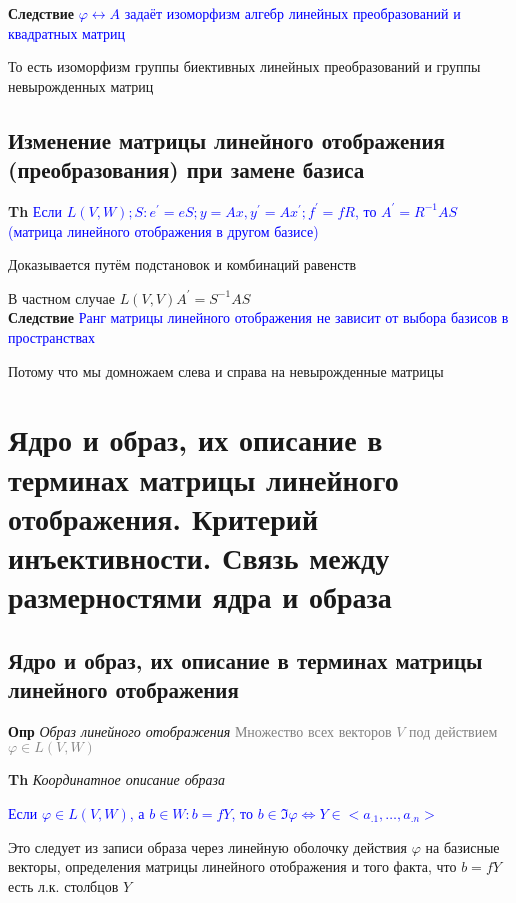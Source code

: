 \documentclass[a4paper, 14pt]{article}
\begin{document}
    \textbf{Следствие} \textcolor{blue}{$\varphi \leftrightarrow A$ задаёт изоморфизм алгебр линейных преобразований
    и квадратных матриц}

    То есть изоморфизм группы биективных линейных преобразований и группы невырожденных матриц

    \subsection{Изменение матрицы линейного отображения (преобразования) при замене базиса}

    \textbf{Th} \textcolor{blue}{Если $L(V, W); S: e^{'} = eS; y = Ax, y^{'} = Ax^{'}; f^{'} = fR$, то
        $A^{'} = R^{-1}AS$ (матрица линейного отображения в другом базисе)}

    Доказывается путём подстановок и комбинаций равенств

    В частном случае $L(V, V) A^{'} = S^{-1}AS$ \\

    \textbf{Следствие} \textcolor{blue}{Ранг матрицы линейного отображения не зависит от выбора базисов в
    пространствах}

    Потому что мы домножаем слева и справа на невырожденные матрицы

    \section{Ядро и образ, их описание в терминах матрицы линейного отображения.
    Критерий инъективности.
    Связь между размерностями ядра и образа}

    \subsection{Ядро и образ, их описание в терминах матрицы линейного отображения}

    \textbf{Опр} \textit{Образ линейного отображения} \textcolor{gray}{Множество всех векторов $V$ под
    действием $\varphi \in L(V, W)$}

    \textbf{Th} \textit{Координатное описание образа}

    \textcolor{blue}{Если $\varphi \in L(V, W)$, а $b \in W: b =
    fY$, то $b \in \Im \varphi \Leftrightarrow Y \in <a_{.1}, \dots, a_{.n}>$}

    Это следует из записи образа через линейную оболочку действия $\varphi$ на базисные векторы, определения матрицы
    линейного отображения и того факта, что $b = fY$ есть л.к. столбцов $Y$
\end{document}
